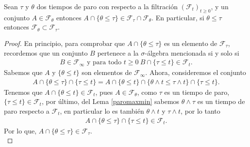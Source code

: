 \begin{lemma}
	\label{sigmaparadasubset}
	Sean $\tau$ y $\theta$ dos tiempos de paro con respecto a la filtración $(\mathcal{F}_t)_{t \geq 0}$, y un conjunto $A \in \mathcal{F}_{\theta}$ entonces $A \cap \{\theta \leq \tau\} \in \mathcal{F}_{\tau} \cap \mathcal{F}_{\theta}$. En particular, si $\theta \leq \tau$ entonces $\mathcal{F}_{\theta} \subset \mathcal{F}_{\tau}$.
\end{lemma}
\begin{proof}
En principio, para comprobar que $A \cap \{\theta \leq \tau\}$ es un elemento de $\mathcal{F}_{\tau}$, recordemos que un conjunto $B$ pertenece a la $\sigma$-álgebra mencionada si y solo si
	\begin{align*}
		B \in \mathcal{F}_{\infty} \text{  y para todo  } t \geq 0 \ B \cap \{\tau \leq t\} \in \mathcal{F}_t.
	\end{align*}
Sabemos que $A$ y $\{\theta \leq t\}$ son elementos de $\mathcal{F}_{\infty}$. Ahora, consideremos el conjunto
	\begin{align*}
		A \cap \{ \theta \leq \tau\} \cap \{\tau \leq t\} = A \cap \{\theta \leq t\} \cap \{\theta \wedge t \leq \tau \wedge t\} \cap \{\tau \leq t\}.
	\end{align*}
Tenemos que $A \cap \{\theta \leq t\} \in \mathcal{F}_t$, pues $A \in \mathcal{F}_{\theta}$, como $\tau$ es un tiempo de paro, $\{\tau \leq t\} \in \mathcal{F}_t$, por último, del Lema \ref{paromaxmin} sabemos $\theta \wedge \tau$ es un tiempo de paro respecto a $\mathcal{F}_t$, en particular lo es también $\theta \wedge t$ y $\tau \wedge t$, por lo tanto
	\begin{align*}
		A \cap \{ \theta \leq \tau\} \cap \{\tau \leq t\} \in \mathcal{F}_t.
	\end{align*}
	Por lo que, $A \cap \{\theta \leq \tau\} \in \mathcal{F}_{\tau}$. \\


\end{proof}

